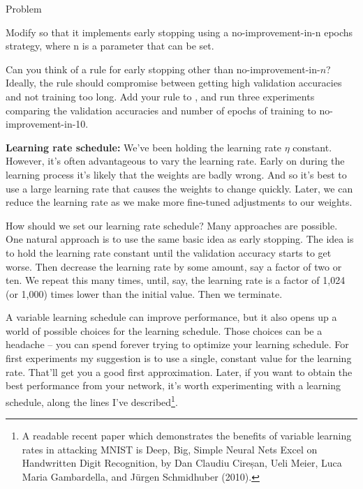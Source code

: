 \documentclass[a4paper,twoside,10pt]{book}
\begin{document}
\begin{exercize}{Problem}
\item Modify  so that it implements early stopping using a no-improvement-in-n epochs strategy, where n is a parameter that can be set.
\item Can you think of a rule for early stopping other than no-improvement-in-$n$? Ideally, the rule should compromise between getting high validation accuracies and not training too long. Add your rule to , and run three experiments comparing the validation accuracies and number of epochs of training to no-improvement-in-10.
\end{exercize}
\textbf{Learning rate schedule:} We've been holding the learning rate $\eta$ constant. However, it's often advantageous to vary the learning rate. Early on during the learning process it's likely that the weights are badly wrong. And so it's best to use a large learning rate that causes the weights to change quickly. Later, we can reduce the learning rate as we make more fine-tuned adjustments to our weights.

How should we set our learning rate schedule? Many approaches are possible. One natural approach is to use the same basic idea as early stopping. The idea is to hold the learning rate constant until the validation accuracy starts to get worse. Then decrease the learning rate by some amount, say a factor of two or ten. We repeat this many times, until, say, the learning rate is a factor of 1,024 (or 1,000) times lower than the initial value. Then we terminate.

A variable learning schedule can improve performance, but it also opens up a world of possible choices for the learning schedule. Those choices can be a headache -- you can spend forever trying to optimize your learning schedule. For first experiments my suggestion is to use a single, constant value for the learning rate. That'll get you a good first approximation. Later, if you want to obtain the best performance from your network, it's worth experimenting with a learning schedule, along the lines I've described\footnote{A readable recent paper which demonstrates the benefits of variable learning rates in attacking MNIST is Deep, Big, Simple Neural Nets Excel on Handwritten Digit Recognition, by Dan Claudiu Cireșan, Ueli Meier, Luca Maria Gambardella, and J\"urgen Schmidhuber (2010).}.
\end{document}
